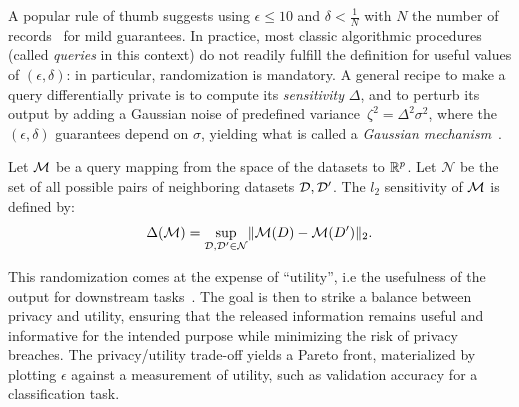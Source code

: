    A popular rule of thumb suggests using $\epsilon \leq 10$ and $\delta < \frac{1}{N}$ with $N$ the number of records~\citep{ponomareva2023dp} for mild guarantees. In practice, most classic algorithmic procedures (called \emph{queries} in this context) do not readily fulfill the definition for useful values of $(\epsilon,\delta)$: in particular, randomization is mandatory.  A general recipe to make a query differentially private is to compute its \emph{sensitivity} $\Delta$, and to perturb its output by adding a Gaussian noise of predefined variance~$\zeta^2=\Delta^2\sigma^2$, where the $(\epsilon,\delta)$ guarantees depend on $\sigma$, yielding what is called a \emph{Gaussian mechanism}~\citep{dwork2006calibrating}.
    \begin{definition}[$l_2$-sensitivity]\label{def:l2sensitivity}
        Let $\mathcal{M}$ be a query mapping from the space of the datasets to $\mathbb{R}^p$. Let $\mathcal{N}$ be the set of all possible pairs of neighboring datasets $\mathcal{D},\mathcal{D}'$. The $l_2$ sensitivity of $\mathcal{M}$ is defined by: 
        \begin{equation}
            \Delta(\mathcal{M}) = \underset{\mathcal{D},\mathcal{D}' \in \mathcal{N}}{\sup} \|\mathcal{M}(D) - \mathcal{M}(D')\|_2.
        \end{equation}
    \end{definition}
    \vspace{-2mm}
    This randomization comes at the expense of ``utility'', i.e the usefulness of the output for downstream tasks~\citep{alvim2012differential}. The goal is then to strike a balance between privacy and utility, ensuring that the released information remains useful and informative for the intended purpose while minimizing the risk of privacy breaches. The privacy/utility trade-off yields a Pareto front, materialized by plotting $\epsilon$ 
    against a measurement of utility, such as validation accuracy for a classification task.    

